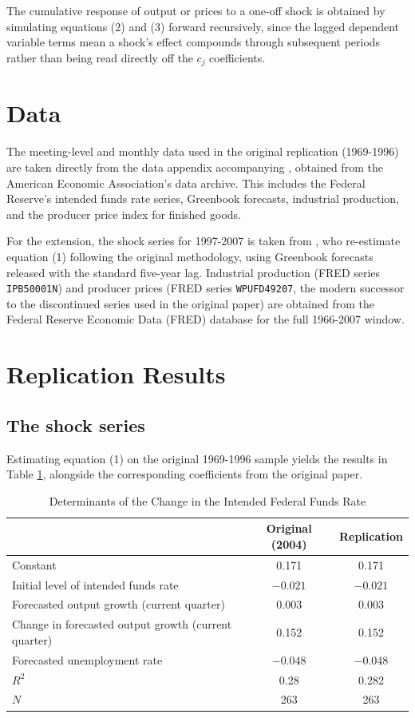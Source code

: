 \documentclass[11pt]{article}
\begin{document}
The cumulative response of output or prices to a one-off shock is obtained by simulating equations (2) and (3) forward recursively, since the lagged dependent variable terms mean a shock's effect compounds through subsequent periods rather than being read directly off the $c_j$ coefficients.

\section{Data}

The meeting-level and monthly data used in the original replication (1969-1996) are taken directly from the data appendix accompanying \citet{romerromer2004}, obtained from the American Economic Association's data archive. This includes the Federal Reserve's intended funds rate series, Greenbook forecasts, industrial production, and the producer price index for finished goods.

For the extension, the shock series for 1997-2007 is taken from \citet{wielandyang2020}, who re-estimate equation (1) following the original methodology, using Greenbook forecasts released with the standard five-year lag. Industrial production (FRED series \texttt{IPB50001N}) and producer prices (FRED series \texttt{WPUFD49207}, the modern successor to the discontinued series used in the original paper) are obtained from the Federal Reserve Economic Data (FRED) database for the full 1966-2007 window.

\section{Replication Results}

\subsection{The shock series}

Estimating equation (1) on the original 1969-1996 sample yields the results in Table \ref{tab:table1}, alongside the corresponding coefficients from the original paper.

\begin{table}[H]
\centering
\caption{Determinants of the Change in the Intended Federal Funds Rate}
\label{tab:table1}
\begin{tabular}{lcc}
\toprule
& Original (2004) & Replication \\
\midrule
Constant & 0.171 & 0.171 \\
Initial level of intended funds rate & $-0.021$ & $-0.021$ \\
Forecasted output growth (current quarter)& 0.003 & 0.003 \\
Change in forecasted output growth (current quarter)& 0.152 & 0.152 \\
Forecasted unemployment rate & $-0.048$ & $-0.048$ \\
\midrule
$R^2$ & 0.28 & 0.282 \\
$N$ & 263 & 263 \\
\bottomrule
\end{tabular}
\end{table}
\end{document}
